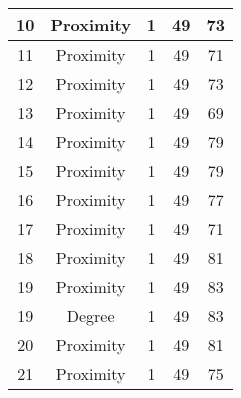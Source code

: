 \documentclass[results.tex]{subfiles}
\begin{document}
\begin{center}
\begin{tabular}{| c || c | c | c | c |}
            \hline
            10                      & Proximity                    & 1                      & 49                      & 73                   \\
            \hline
            11                      & Proximity                    & 1                      & 49                      & 71                   \\
            \hline
            12                      & Proximity                    & 1                      & 49                      & 73                   \\
            \hline
            13                      & Proximity                    & 1                      & 49                      & 69                   \\
            \hline
            14                      & Proximity                    & 1                      & 49                      & 79                   \\
            \hline
            15                      & Proximity                    & 1                      & 49                      & 79                   \\
            \hline
            16                      & Proximity                    & 1                      & 49                      & 77                   \\
            \hline
            17                      & Proximity                    & 1                      & 49                      & 71                   \\
            \hline
            18                      & Proximity                    & 1                      & 49                      & 81                   \\
            \hline
            19                      & Proximity                    & 1                      & 49                      & 83                   \\
            \hline
            19                      & Degree                       & 1                      & 49                      & 83                   \\
            \hline
            20                      & Proximity                    & 1                      & 49                      & 81                   \\
            \hline
            21                      & Proximity                    & 1                      & 49                      & 75                   \\

\end{tabular}
\end{center}
\end{document}
